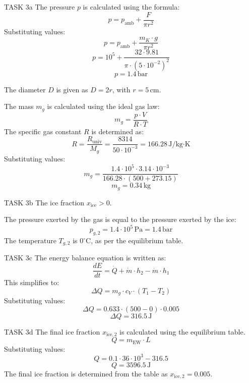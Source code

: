 TASK 3a  
The pressure \( p \) is calculated using the formula:  
\[
p = p_{\text{amb}} + \frac{F}{\pi r^2}
\]  
Substituting values:  
\[
p = p_{\text{amb}} + \frac{m_K \cdot g}{\pi r^2}
\]  
\[
p = 10^5 + \frac{32 \cdot 9.81}{\pi \cdot (5 \cdot 10^{-2})^2}
\]  
\[
p = 1.4 \, \text{bar}
\]  

The diameter \( D \) is given as \( D = 2r \), with \( r = 5 \, \text{cm} \).  

The mass \( m_g \) is calculated using the ideal gas law:  
\[
m_g = \frac{p \cdot V}{R \cdot T}
\]  
The specific gas constant \( R \) is determined as:  
\[
R = \frac{R_{\text{univ}}}{M_g} = \frac{8314}{50 \cdot 10^{-3}} = 166.28 \, \text{J/kg·K}
\]  
Substituting values:  
\[
m_g = \frac{1.4 \cdot 10^5 \cdot 3.14 \cdot 10^{-3}}{166.28 \cdot (500 + 273.15)}
\]  
\[
m_g = 0.34 \, \text{kg}
\]  

TASK 3b  
The ice fraction \( x_{\text{ice}} > 0 \).  

The pressure exerted by the gas is equal to the pressure exerted by the ice:  
\[
p_{g,2} = 1.4 \cdot 10^5 \, \text{Pa} = 1.4 \, \text{bar}
\]  
The temperature \( T_{g,2} \) is \( 0^\circ\text{C} \), as per the equilibrium table.  

TASK 3c  
The energy balance equation is written as:  
\[
\frac{dE}{dt} = \dot{Q} + \dot{m} \cdot h_2 - \dot{m} \cdot h_1
\]  
This simplifies to:  
\[
\Delta Q = m_g \cdot c_V \cdot (T_1 - T_2)
\]  
Substituting values:  
\[
\Delta Q = 0.633 \cdot (500 - 0) \cdot 0.005
\]  
\[
\Delta Q = 316.5 \, \text{J}
\]  

TASK 3d  
The final ice fraction \( x_{\text{ice},2} \) is calculated using the equilibrium table.  
\[
Q = m_{\text{EW}} \cdot L
\]  
Substituting values:  
\[
Q = 0.1 \cdot 36 \cdot 10^3 - 316.5
\]  
\[
Q = 3596.5 \, \text{J}
\]  
The final ice fraction is determined from the table as \( x_{\text{ice},2} = 0.005 \).